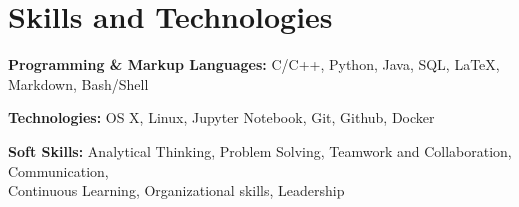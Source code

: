 \section{Skills and Technologies}

\begin{onecolentry}
    \textbf{Programming \& Markup Languages:} C/C++, Python, Java, SQL, LaTeX, Markdown, Bash/Shell
\end{onecolentry}

\vspace{0.2 cm} %

\begin{onecolentry}
    \textbf{Technologies:} OS X, Linux, Jupyter Notebook, Git, Github, Docker
\end{onecolentry}

\vspace{0.2 cm} %

\begin{onecolentry}
    \textbf{Soft Skills:}  Analytical Thinking, Problem Solving, Teamwork and Collaboration, Communication, \\ 
    \text{\hspace{1.68cm}} Continuous Learning, Organizational skills, Leadership
\end{onecolentry}
